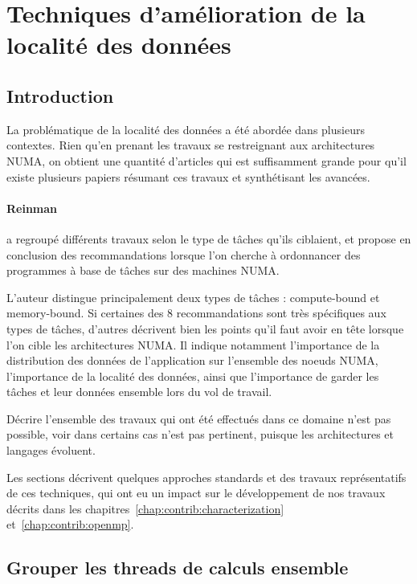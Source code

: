 \section{Techniques d'amélioration de la localité des données}\label{sec:rw:numa}

\subsection{Introduction}

La problématique de la localité des données a été abordée dans plusieurs contextes.
Rien qu'en prenant les travaux se restreignant aux architectures NUMA, on obtient une quantité d'articles qui est suffisamment grande pour qu'il existe plusieurs papiers résumant ces travaux et synthétisant les avancées.

\paragraph{Reinman~\cite{Reinman2015}} a regroupé différents travaux selon le type de tâches qu'ils ciblaient, et propose en conclusion des recommandations lorsque l'on cherche à ordonnancer des programmes à base de tâches sur des machines NUMA.

L'auteur distingue principalement deux types de tâches : compute-bound et memory-bound.
Si certaines des 8 recommandations sont très spécifiques aux types de tâches, d'autres décrivent bien les points qu'il faut avoir en tête lorsque l'on cible les architectures NUMA.
Il indique notamment l'importance de la distribution des données de l'application sur l'ensemble des noeuds NUMA, l'importance de la localité des données, ainsi que l'importance de garder les tâches et leur données ensemble lors du vol de travail.



Décrire l'ensemble des travaux qui ont été effectués dans ce domaine n'est pas possible, voir dans certains cas n'est pas pertinent, puisque les architectures et langages évoluent.

Les sections décrivent quelques approches standards et des travaux représentatifs de ces techniques, qui ont eu un impact sur le développement de nos travaux décrits dans les chapitres~\ref{chap:contrib:characterization} et~\ref{chap:contrib:openmp}.



\subsection{Grouper les threads de calculs ensemble}

